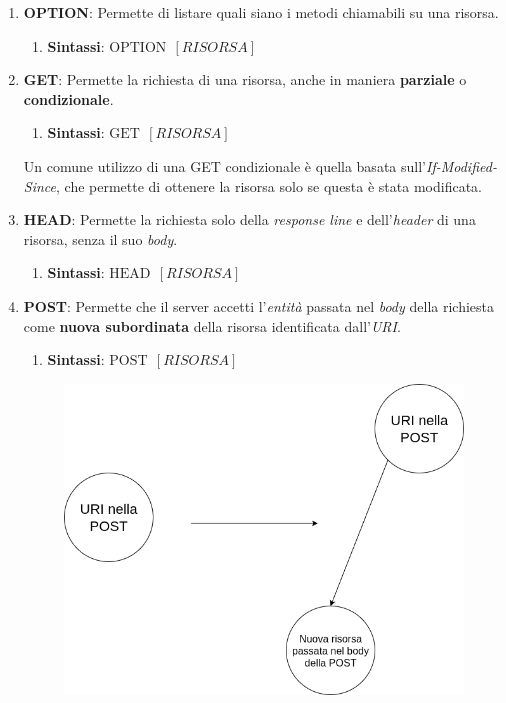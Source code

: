\documentclass{article}
\begin{document}
\begin{enumerate}
    \item \textbf{OPTION}: Permette di listare quali siano i metodi chiamabili su una risorsa.
    \begin{enumerate}
        \item \textbf{Sintassi}: $\boxed{\text{OPTION} \:\: [RISORSA]}$
    \end{enumerate}
    \item \textbf{GET}: Permette la richiesta di una risorsa, anche in maniera \textbf{parziale} o \textbf{condizionale}.
    \begin{enumerate}
        \item \textbf{Sintassi}: $\boxed{\text{GET} \:\: [RISORSA]}$
    \end{enumerate}
    Un comune utilizzo di una GET condizionale è quella basata sull'\textit{If-Modified-Since}, che permette di ottenere la risorsa solo se questa è stata modificata.
    \item \textbf{HEAD}: Permette la richiesta solo della \textit{response line} e dell'\textit{header} di una risorsa, senza il suo \textit{body}.
    \begin{enumerate}
        \item \textbf{Sintassi}: $\boxed{\text{HEAD} \:\: [RISORSA]}$
    \end{enumerate}
    \item \textbf{POST}: Permette che il server accetti l'\textit{entità} passata nel \textit{body} della richiesta come \textbf{nuova subordinata} della risorsa identificata dall'\textit{URI}.
    \begin{enumerate}
        \item \textbf{Sintassi}: $\boxed{\text{POST} \:\: [RISORSA]}$
    \end{enumerate}
    \begin{figure}[htbp]
        \center
        \includegraphics[scale=0.275]{img/metodoPOST.png}

\end{figure}
\end{enumerate}
\end{document}
